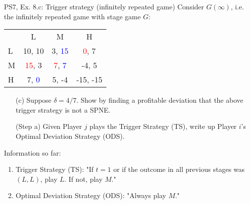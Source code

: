 \begin{frame}{PS7, Ex. 8.c: Trigger strategy (infinitely repeated game)}
    Consider $G(\infty)$, i.e. the infinitely repeated game with stage game $G$: \vspace{-6pt}
    \begin{table}
      \begin{tabular}{l|c|c|c|}
        \multicolumn{1}{c}{} & \multicolumn{1}{c}{L} & \multicolumn{1}{c}{M} & \multicolumn{1}{c}{H} \\\cline{2-4}
        L & 10, 10 & 3, \textcolor{blue}{15} & \textcolor{red}{0}, 7 \\\cline{2-4}
        M & \textcolor{red}{15}, 3 & \textcolor{red}{7}, \textcolor{blue}{7} & -4, 5 \\\cline{2-4}
        H & 7, \textcolor{blue}{0} & 5, -4 & -15, -15 \\\cline{2-4}
      \end{tabular}
    \end{table}
    \begin{itemize}
      \vspace{-4pt} \item[(c)] Suppose $\delta = 4/7$. Show by finding a profitable deviation that the above trigger strategy is not a SPNE. \vspace{-6pt}
    \end{itemize}
    \begin{multicols}{2}
      \begin{itemize}
        \item[(Step a)] Given Player $j$ plays the Trigger Strategy (TS), write up Player $i$'s Optimal Deviation Strategy (ODS).
      \end{itemize}
      \vfill\null\columnbreak
      Information so far:
      \begin{enumerate}
        \item Trigger Strategy (TS): "If $t=1$ or if the outcome in all previous stages was $(L,L)$, play $L$. If not, play $M$."
        \item Optimal Deviation Strategy (ODS): "Always play $M$."
      \end{enumerate}
      \vfill\null
    \end{multicols}
\end{frame}
